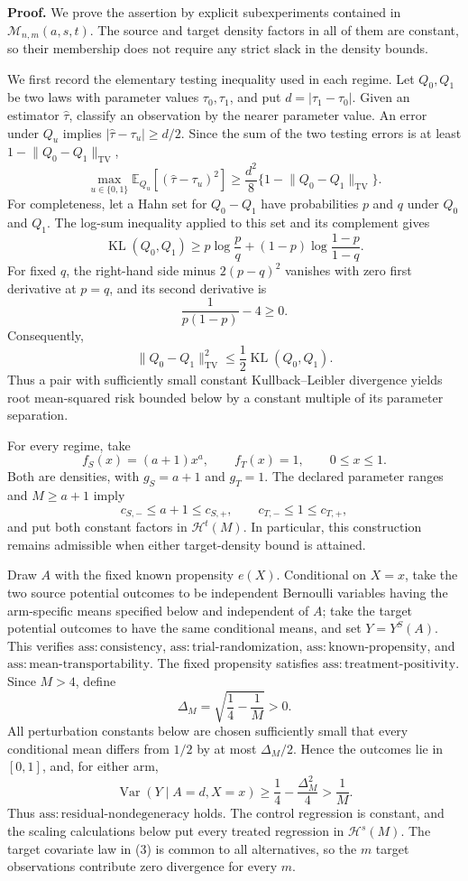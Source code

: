 \textbf{Proof.}
We prove the assertion by explicit subexperiments contained in \(\mathcal M_{n,m}(a,s,t)\).  The source and target density factors in all of them are constant, so their membership does not require any strict slack in the density bounds.

We first record the elementary testing inequality used in each regime.  Let \(Q_0,Q_1\) be two laws with parameter values \(\tau_0,\tau_1\), and put \(d=|\tau_1-\tau_0|\).  Given an estimator \(\widehat\tau\), classify an observation by the nearer parameter value.  An error under \(Q_u\) implies \(|\widehat\tau-\tau_u|\ge d/2\).  Since the sum of the two testing errors is at least \(1-\lVert Q_0-Q_1\rVert_{\mathrm{TV}}\),
\[
 \max_{u\in\{0,1\}}\mathbb E_{Q_u}
       [ (\widehat\tau-\tau_u)^2 ]
 \ge \frac{d^2}{8}
       \{1-\lVert Q_0-Q_1\rVert_{\mathrm{TV}}\}.
\tag{1}
\]
For completeness, let a Hahn set for \(Q_0-Q_1\) have probabilities \(p\) and \(q\) under \(Q_0\) and \(Q_1\).  The log-sum inequality applied to this set and its complement gives
\[
 \operatorname{KL}(Q_0,Q_1)
 \ge p\log\frac pq+(1-p)\log\frac{1-p}{1-q}.
\]
For fixed \(q\), the right-hand side minus \(2(p-q)^2\) vanishes with zero first derivative at \(p=q\), and its second derivative is
\[
 \frac{1}{p(1-p)}-4\ge0.
\]
Consequently,
\[
 \lVert Q_0-Q_1\rVert_{\mathrm{TV}}^2
 \le \frac12\operatorname{KL}(Q_0,Q_1).
\tag{2}
\]
Thus a pair with sufficiently small constant Kullback--Leibler divergence yields root mean-squared risk bounded below by a constant multiple of its parameter separation.

For every regime, take
\[
 f_S(x)=(a+1)x^a,
 \qquad f_T(x)=1,
 \qquad 0\le x\le1.
\tag{3}
\]
Both are densities, with \(g_S=a+1\) and \(g_T=1\).  The declared parameter ranges and \(M\ge a+1\) imply
\[
 c_{S,-}\le a+1\le c_{S,+},
 \qquad c_{T,-}\le1\le c_{T,+},
\tag{4}
\]
and put both constant factors in \(\mathcal H^t(M)\).  In particular, this construction remains admissible when either target-density bound is attained.

Draw \(A\) with the fixed known propensity \(e(X)\).  Conditional on \(X=x\), take the two source potential outcomes to be independent Bernoulli variables having the arm-specific means specified below and independent of \(A\); take the target potential outcomes to have the same conditional means, and set \(Y=Y^S(A)\).  This verifies \(\mathrm{ass:consistency}\), \(\mathrm{ass:trial\text{-}randomization}\), \(\mathrm{ass:known\text{-}propensity}\), and \(\mathrm{ass:mean\text{-}transportability}\).  The fixed propensity satisfies \(\mathrm{ass:treatment\text{-}positivity}\).  Since \(M>4\), define
\[
 \Delta_M=\sqrt{\frac14-\frac1M}>0.
\]
All perturbation constants below are chosen sufficiently small that every conditional mean differs from \(1/2\) by at most \(\Delta_M/2\).  Hence the outcomes lie in \([0,1]\), and, for either arm,
\[
 \operatorname{Var}(Y\mid A=d,X=x)
 \ge \frac14-\frac{\Delta_M^2}{4}
 >\frac1M.
\tag{5}
\]
Thus \(\mathrm{ass:residual\text{-}nondegeneracy}\) holds.  The control regression is constant, and the scaling calculations below put every treated regression in \(\mathcal H^s(M)\).  The target covariate law in (3) is common to all alternatives, so the \(m\) target observations contribute zero divergence for every \(m\).

